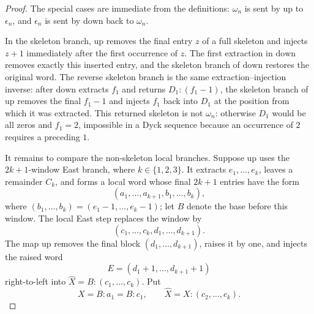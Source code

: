 \documentclass[11pt]{article}
\theoremstyle{plain}
\theoremstyle{definition}
\theoremstyle{remark}
\begin{document}
\begin{proof}
The special cases are immediate from the definitions:
\(\omega_n\) is sent by \(\mathrm{up}\) to \(\epsilon_n\), and \(\epsilon_n\)
is sent by \(\mathrm{down}\) back to \(\omega_n\).

In the skeleton branch, \(\mathrm{up}\) removes the final entry \(z\) of a full
skeleton and injects \(z+1\) immediately after the first occurrence of \(z\).
The first extraction in \(\mathrm{down}\) removes exactly this inserted entry,
and the skeleton branch of \(\mathrm{down}\) restores the original word.  The
reverse skeleton branch is the same extraction--injection inverse: after
\(\mathrm{down}\) extracts \(f_1\) and returns \(D_1:(f_1-1)\), the skeleton
branch of \(\mathrm{up}\) removes the final \(f_1-1\) and injects \(f_1\) back
into \(D_1\) at the position from which it was extracted.  This returned
skeleton is not \(\omega_n\): otherwise \(D_1\) would be all zeros and
\(f_1=2\), impossible in a Dyck sequence because an occurrence of \(2\)
requires a preceding \(1\).

It remains to compare the non-skeleton local branches.  Suppose \(\mathrm{up}\)
uses the \(2k+1\)-window East branch, where \(k\in\{1,2,3\}\).  It extracts
\(e_1,\ldots,e_k\), leaves a remainder \(C_k\), and forms a local word whose
final \(2k+1\) entries have the form
\[
  (a_1,\ldots,a_{k+1},b_1,\ldots,b_k),
\]
where \((b_1,\ldots,b_k)=(e_1-1,\ldots,e_k-1)\); let \(B\) denote the base
before this window.  The local East step replaces the window by
\[
  (c_1,\ldots,c_k,d_1,\ldots,d_{k+1}).
\]
The map \(\mathrm{up}\) removes the final block
\((d_1,\ldots,d_{k+1})\), raises it by one, and injects the raised word
\[
  E=(d_1+1,\ldots,d_{k+1}+1)
\]
right-to-left into \(\widehat X=B:(c_1,\ldots,c_k)\).  Put
\[
  X=B:a_1=B:c_1,
  \qquad
  \widehat X=X:(c_2,\ldots,c_k).
\]


\end{proof}
\end{document}
